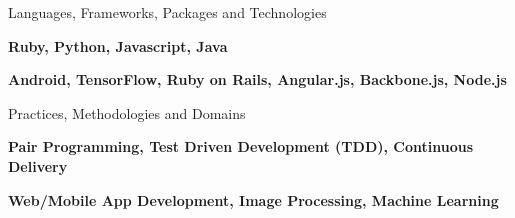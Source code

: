 \begin{cventries}
  \cventry
    {Languages, Frameworks, Packages and Technologies}
    {}
    {}
    {}
    {
      \begin{cvitems}
        \item {\textbf{Ruby, Python, Javascript, Java}}
        \item {\textbf{Android, TensorFlow, Ruby on Rails, Angular.js, Backbone.js, Node.js}}
      \end{cvitems}
    }
  \cventry
    {Practices, Methodologies and Domains}
    {}
    {}
    {}
    {
      \begin{cvitems}
        \item {\textbf{Pair Programming, Test Driven Development (TDD), Continuous Delivery}}
        \item {\textbf{Web/Mobile App Development, Image Processing, Machine Learning}}
      \end{cvitems}
    }
\end{cventries}
